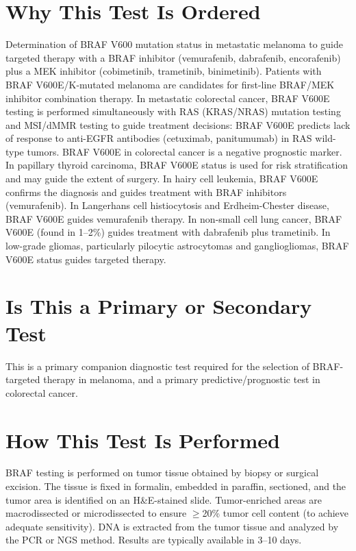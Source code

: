 \section*{Why This Test Is Ordered}
Determination of BRAF V600 mutation status in metastatic melanoma to guide targeted therapy with a BRAF inhibitor (vemurafenib, dabrafenib, encorafenib) plus a MEK inhibitor (cobimetinib, trametinib, binimetinib). Patients with BRAF V600E/K-mutated melanoma are candidates for first-line BRAF/MEK inhibitor combination therapy. In metastatic colorectal cancer, BRAF V600E testing is performed simultaneously with RAS (KRAS/NRAS) mutation testing and MSI/dMMR testing to guide treatment decisions: BRAF V600E predicts lack of response to anti-EGFR antibodies (cetuximab, panitumumab) in RAS wild-type tumors. BRAF V600E in colorectal cancer is a negative prognostic marker. In papillary thyroid carcinoma, BRAF V600E status is used for risk stratification and may guide the extent of surgery. In hairy cell leukemia, BRAF V600E confirms the diagnosis and guides treatment with BRAF inhibitors (vemurafenib). In Langerhans cell histiocytosis and Erdheim-Chester disease, BRAF V600E guides vemurafenib therapy. In non-small cell lung cancer, BRAF V600E (found in 1--2\%) guides treatment with dabrafenib plus trametinib. In low-grade gliomas, particularly pilocytic astrocytomas and gangliogliomas, BRAF V600E status guides targeted therapy.

\section*{Is This a Primary or Secondary Test}
This is a primary companion diagnostic test required for the selection of BRAF-targeted therapy in melanoma, and a primary predictive/prognostic test in colorectal cancer.

\section*{How This Test Is Performed}
BRAF testing is performed on tumor tissue obtained by biopsy or surgical excision. The tissue is fixed in formalin, embedded in paraffin, sectioned, and the tumor area is identified on an H\&E-stained slide. Tumor-enriched areas are macrodissected or microdissected to ensure $\geq$20\% tumor cell content (to achieve adequate sensitivity). DNA is extracted from the tumor tissue and analyzed by the PCR or NGS method. Results are typically available in 3--10 days.


